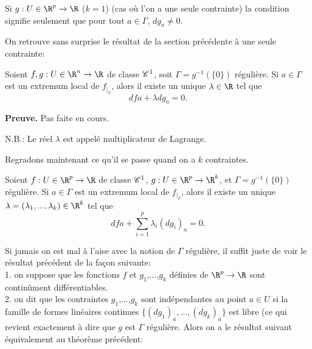 \documentclass[12pt, class=report,crop=false]{standalone}
\begin{document}
{{{\begin{remarque*}
\textcolor[rgb]{0.00,0.00,1.00}{
  Si $g: U \in \R^p \rightarrow \R$ ($k=1$) (cas où l'on a une seule contrainte) la condition signifie seulement que pour tout $a \in \Gamma$,
$dg_a \neq 0$.}
\end{remarque*}

\noindent On retrouve sans surprise le résultat de la section précédente à une seule contrainte:

\begin{theoreme}
\textcolor[rgb]{0.44,0.00,0.87}{
  Soient $f,g: U \in \R^n \rightarrow \R$ de classe $\mathscr{C}^1$, soit $\Gamma=g^{-1}(\{0\})$ r\'eguli\`ere. Si $a \in \Gamma$
est un extremum local de  $f_{\mid _\Gamma}$, alors il existe un unique $\lambda \in \R$ tel que
\begin{equation*}
  dfa + \lambda dg_a=0.
\end{equation*}}
\end{theoreme}

{\textbf{Preuve.}} Pas faite en cours.

N.B.: Le r\'eel $\lambda$ est appel\'e multiplicateur de Lagrange.

\noindent Regradons maintenant ce qu'il se passe quand on a $k$ contraintes. 

\begin{theoreme}
\textcolor[rgb]{0.44,0.00,0.87}{
  Soient $f: U \in \R^p \rightarrow \R$ de classe $\mathscr{C}^1$, $g: U \in\R^p \rightarrow \R^k$,  et $\Gamma=g^{-1}(\{0\})$ r\'eguli\`ere. Si $a \in \Gamma$
est un extremum local de  $f_{\mid _\Gamma}$, alors il existe un unique $\lambda=(\lambda_1,...,\lambda_k) \in \R^k$ tel que
\begin{equation*}
  dfa + \displaystyle \sum_{i=1}^p \lambda_i (dg_i)_a=0.
\end{equation*}}
\end{theoreme}

\noindent Si jamais on est mal à l'aise avec la notion de $\Gamma$ régulière, il suffit juste de voir le résultat précédent de la façon suivante:\\
1. on suppose que les fonctions $f$ et $g_1$,...,$g_k$ définies de $\R^p \rightarrow \R$ sont contin\^ument diff\'erentiables.\\
2. on dit que les contraintes $g_1$,...,$g_k$ sont ind\'ependantes au point $a \in U$ si la famille de formes
lin\'eaires continues $\{(dg_1)_a,...,(dg_k)_a\}$ est libre (ce qui revient exactement à dire que $g$ est $\Gamma$ régulière. Alors on a le résultat suivant équivalement au théorème précédent:


}}}
\end{document}
